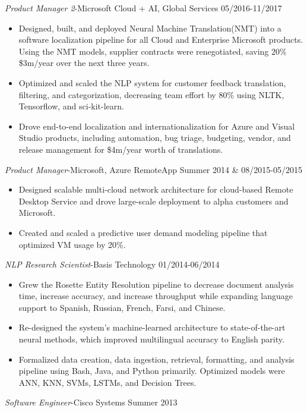 \documentclass[line,margin]{res}
\begin{document}
\begin{resume}
\begin{itemize}
\end{itemize}
{\sl Product Manager 2}-Microsoft Cloud + AI, Global Services \hfill 05/2016-11/2017
\begin{itemize}  \itemsep -4pt
\item Designed, built, and deployed Neural Machine Translation(NMT) into a software localization pipeline for all Cloud and Enterprise Microsoft products. Using the NMT models, supplier contracts were renegotiated, saving $20\%$  \$3m/year over the next three years.
\item Optimized and scaled the NLP system for customer feedback translation, filtering, and categorization, decreasing team effort by $80\%$ using NLTK, Tensorflow, and sci-kit-learn.
\item Drove end-to-end localization and internationalization for Azure and Visual Studio products, including automation, bug triage, budgeting, vendor, and release management for \$4m/year worth of translations.
\end{itemize}
{\sl Product Manager}-Microsoft, Azure RemoteApp  \hfill Summer 2014 \& 08/2015-05/2015
\begin{itemize}  \itemsep -4pt
\item Designed scalable multi-cloud network architecture for cloud-based Remote Desktop Service and drove large-scale deployment to alpha customers and Microsoft.
\item Created and scaled a predictive user demand modeling pipeline that optimized VM usage by 20\%.
\end{itemize}
{\sl NLP Research Scientist}-Basis Technology \hfill 01/2014-06/2014
\begin{itemize}  \itemsep -4pt
\item Grew the Rosette Entity Resolution pipeline to decrease document analysis time, increase accuracy, and increase throughput while expanding language support to Spanish, Russian, French, Farsi, and Chinese.
\item Re-designed the system's machine-learned architecture to state-of-the-art neural methods, which improved multilingual accuracy to English parity.
\item Formalized data creation, data ingestion, retrieval, formatting, and analysis pipeline using Bash, Java, and Python primarily. Optimized models were ANN, KNN, SVMs, LSTMs, and Decision Trees.
\end{itemize}
{\sl Software Engineer}-Cisco Systems \hfill Summer 2013
\begin{itemize}  \itemsep -4pt

\end{itemize}
\end{resume}
\end{document}
